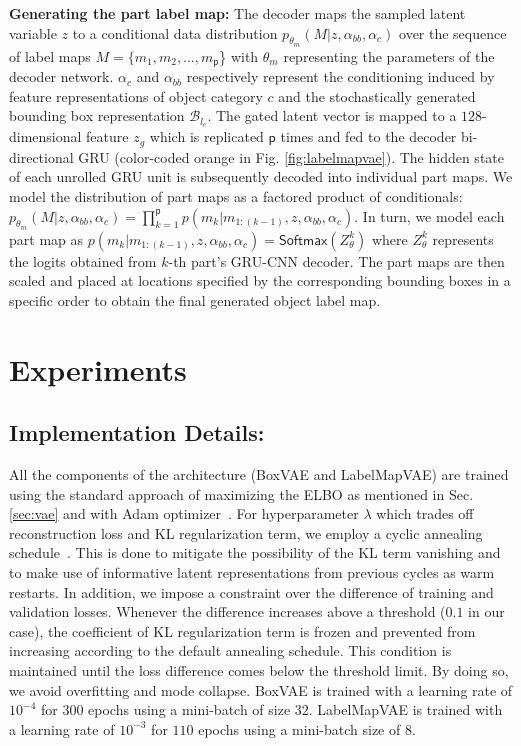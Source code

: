 \documentclass[runningheads]{llncs}
\begin{document}
\noindent \textbf{Generating the part label map:} The decoder maps the sampled latent variable $z$ to a conditional data distribution $p_{\theta_m}(M|z,\alpha_{bb},\alpha_{c})$ over the sequence of label maps $M = \{m_1,m_2,\ldots,m_\mathsf{p}$\} with $\theta_m$ representing the parameters of the decoder network. $\alpha_c$ and $\alpha_{bb}$ respectively represent the conditioning induced by feature representations of object category $c$ and the stochastically generated bounding box representation $\mathcal{B}_{l_c}$.
The gated latent vector is mapped to a $128$-dimensional feature $z_g$ which is replicated $\mathsf{p}$ times and fed to the decoder bi-directional GRU (color-coded orange in Fig. \ref{fig:labelmapvae}).
The hidden state of each unrolled GRU unit is subsequently decoded into individual part maps. We model the distribution of part maps as a factored product of conditionals: $p_{\theta_m}(M|z,\alpha_{bb},\alpha_{c}) = \prod_{k=1}^{\mathsf{p}} p(m_k | m_{1:(k-1)}, z, \alpha_{bb}, \alpha_{c})$. In turn, we model each part map as $p(m_k | m_{1:(k-1)}, z, \alpha_{bb}, \alpha_{c}) = \mathsf{ Softmax}(Z_{\theta}^k)$ where $Z_{\theta}^k$ represents the logits obtained from $k$-th part's GRU-CNN decoder. The part maps are then scaled and placed at locations specified by the corresponding bounding boxes in a specific order to obtain the final generated object label map.

\section{Experiments}
\label{sec:experiments}

\subsection{Implementation Details:}
\label{sec:impldetails}

All the components of the architecture (BoxVAE and LabelMapVAE) are trained using the standard approach of maximizing the ELBO as mentioned in Sec. \ref{sec:vae} and with Adam optimizer~\cite{kingma2014adam}. For hyperparameter $\lambda$ which trades off reconstruction loss and KL regularization term, we employ a cyclic annealing schedule~\cite{fu2019cyclical}. This is done to mitigate the possibility of the KL term vanishing and to make use of informative latent representations from previous cycles as warm restarts. In addition, we impose a constraint over the difference of training and validation losses. Whenever the difference increases above a threshold ($0.1$ in our case), the coefficient of KL regularization term is frozen and prevented from increasing according to the default annealing schedule. This condition is maintained until the loss difference comes below the threshold limit. By doing so, we avoid overfitting and mode collapse. BoxVAE is trained with a learning rate of $10^{-4}$ for $300$ epochs using a mini-batch of size $32$. LabelMapVAE is trained with a learning rate of $10^{-3}$ for $110$ epochs using a mini-batch size of $8$.
\end{document}
